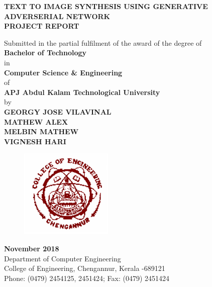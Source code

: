 \documentclass[a4paper,12pt,oneside]{article}
\begin{document}
\thispagestyle{empty}
\begin{center}

\large{\textbf{{TEXT TO IMAGE SYNTHESIS USING GENERATIVE ADVERSERIAL NETWORK}}}
\setlength{\baselineskip}{1.5\baselineskip}
\\
\vspace{5mm}
\textbf{PROJECT REPORT}

Submitted in the partial fulfilment of the award of the degree
of
\\
\textbf{Bachelor of Technology}
\\
in
\\
\textbf{Computer Science \& Engineering}
\\
of
\\
\textbf{APJ Abdul Kalam Technological University}
\\
by
\\
\textbf{GEORGY JOSE VILAVINAL}
\\
\textbf{MATHEW ALEX}
\\
\textbf{MELBIN MATHEW}
\\
\textbf{VIGNESH HARI}
\\
\vspace{5mm}
\begin{figure}[H]
\centering
\includegraphics{ceclogo.png}
\end{figure}
\textbf{November 2018}
\vspace{8mm}
\\
Department of Computer Engineering
\\
College of Engineering, Chengannur, Kerala -689121
\\
Phone: (0479) 2454125, 2451424; Fax: (0479) 2451424
\\
\end{center}
\end{document}
